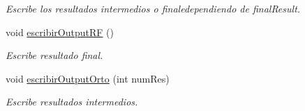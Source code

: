 \begin{DoxyCompactItemize}
\begin{DoxyCompactList}\small\item\em Escribe los resultados intermedios o finaledependiendo de final\+Result. \end{DoxyCompactList}\item 
\mbox{\label{classuav_1_1Stitcher_aedccb071e6ee13405e842c0764a08ecd}} 
void \mbox{\hyperlink{classuav_1_1Stitcher_aedccb071e6ee13405e842c0764a08ecd}{escribir\+Output\+RF}} ()
\begin{DoxyCompactList}\small\item\em Escribe resultado final. \end{DoxyCompactList}\item 
void \mbox{\hyperlink{classuav_1_1Stitcher_aa3ed2d63f08d787b3b78ec4445195b2b}{escribir\+Output\+Orto}} (int num\+Res)
\begin{DoxyCompactList}\small\item\em Escribe resultados intermedios. \end{DoxyCompactList}\end{DoxyCompactItemize}
